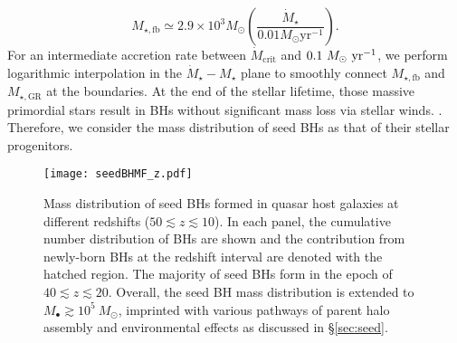 \documentclass[twocolumn, twocolappendix]{aastex63}
\newcommand{\Msun}{M_\odot}
\newcommand{\Msunyr}{M_\odot~{\rm yr}^{-1}}
\newcommand{\Mdot}{\dot{M}}
\begin{document}
\begin{CJK*}{UTF8}{gbsn}
%
\begin{equation}
M_{\star, \mathrm{fb}} \simeq 2.9 \times 10^{3} \Msun\left(\frac{\dot{M}_{\star}}{0.01 M_{\odot} \mathrm{yr}^{-1}}\right).
\end{equation}
%
For an intermediate accretion rate between $\Mdot_\mathrm{crit}$ and $0.1~\Msunyr$, 
we perform logarithmic interpolation in the $\Mdot_\star - M_\star$ plane to smoothly connect 
$M_{\star, \mathrm{fb}}$ and $M_{\star, \mathrm{GR}}$ at the boundaries.
At the end of the stellar lifetime, those massive primordial stars result in BHs without significant mass loss via stellar winds.
\citep{2003ApJ...591..288H,2010ApJ...714.1217B,2015MNRAS.451.4086S}.
Therefore, we consider the mass distribution of seed BHs as that of their stellar progenitors. 


\begin{figure*}
\centering
\texttt{[image: seedBHMF\_z.pdf]}
\caption{
Mass distribution of seed BHs formed in quasar host galaxies at different redshifts ($50\lesssim z \lesssim 10$).
In each panel, the cumulative number distribution of BHs are shown and 
the contribution from newly-born BHs at the redshift interval are denoted with the hatched region.
The majority of seed BHs form in the epoch of $40\lesssim z \lesssim 20$.
Overall, the seed BH mass distribution is extended to $M_\bullet \gtrsim 10^5~\Msun$, 
imprinted with various pathways of parent halo assembly and environmental effects as discussed in \S\ref{sec:seed}.
}
\label{fig:seedmf}
\end{figure*}



\end{CJK*}
\end{document}
